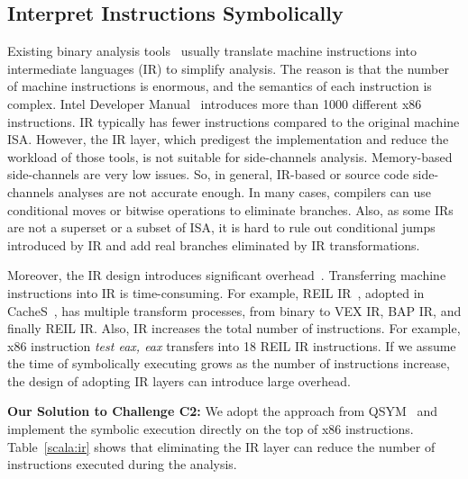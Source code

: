 \subsection{Interpret Instructions Symbolically}
Existing binary analysis tools~\cite{shoshitaishvili2016state,
10.1007/978-3-642-22110-1_37} usually translate machine instructions into
intermediate languages (IR) to simplify analysis. 
The reason is that the number of machine instructions is
enormous, and the semantics of each instruction is complex. Intel Developer
Manual~\cite{intelsys} introduces more than 1000 different x86 instructions. 
IR typically has fewer instructions compared to the original machine ISA\@.
However, the IR layer, which predigest the implementation
and reduce the workload of those tools, is not suitable for side-channels 
analysis. Memory-based side-channels are very low issues. So, in general,
IR-based or source code side-channels analyses are not accurate enough.
In many cases, compilers can use conditional moves or bitwise operations to eliminate
branches. Also, as some IRs are not a superset or a subset of ISA, 
it is hard to rule out conditional jumps introduced by IR and add real branches 
eliminated by IR transformations.

Moreover, the IR design introduces significant overhead~\cite{217563}.
Transferring machine instructions into IR is time-consuming. For example,
REIL IR~\cite{dullien2009reil}, adopted in CacheS~\cite{236338}, has multiple
transform processes, from binary to VEX IR, BAP IR, and finally REIL IR\@. 
Also, IR increases the total number of instructions. For example, x86
instruction \textit{test eax, eax} transfers into 18 REIL IR instructions. If we
assume the time of symbolically executing grows as the number of instructions increase, the
design of adopting IR layers can introduce large overhead.

\vspace*{2pt}
\textbf{Our Solution to Challenge C2:}
We adopt the approach from QSYM~\cite{217563} and implement the symbolic execution
directly on the top of x86 instructions. Table~\ref{scala:ir} shows that
eliminating the IR layer can reduce the number of instructions executed during
the analysis.

